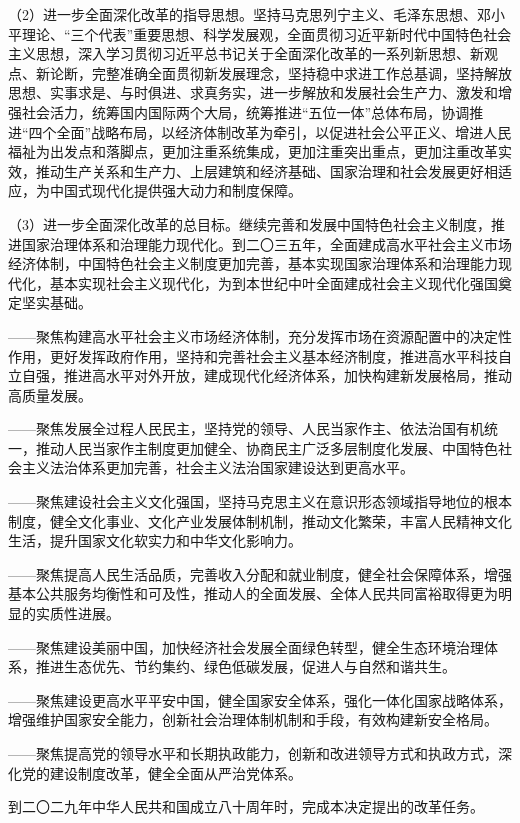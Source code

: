     （2）进一步全面深化改革的指导思想。坚持马克思列宁主义、毛泽东思想、邓小平理论、“三个代表”重要思想、科学发展观，全面贯彻习近平新时代中国特色社会主义思想，深入学习贯彻习近平总书记关于全面深化改革的一系列新思想、新观点、新论断，完整准确全面贯彻新发展理念，坚持稳中求进工作总基调，坚持解放思想、实事求是、与时俱进、求真务实，进一步解放和发展社会生产力、激发和增强社会活力，统筹国内国际两个大局，统筹推进“五位一体”总体布局，协调推进“四个全面”战略布局，以经济体制改革为牵引，以促进社会公平正义、增进人民福祉为出发点和落脚点，更加注重系统集成，更加注重突出重点，更加注重改革实效，推动生产关系和生产力、上层建筑和经济基础、国家治理和社会发展更好相适应，为中国式现代化提供强大动力和制度保障。

    （3）进一步全面深化改革的总目标。继续完善和发展中国特色社会主义制度，推进国家治理体系和治理能力现代化。到二〇三五年，全面建成高水平社会主义市场经济体制，中国特色社会主义制度更加完善，基本实现国家治理体系和治理能力现代化，基本实现社会主义现代化，为到本世纪中叶全面建成社会主义现代化强国奠定坚实基础。

    ——聚焦构建高水平社会主义市场经济体制，充分发挥市场在资源配置中的决定性作用，更好发挥政府作用，坚持和完善社会主义基本经济制度，推进高水平科技自立自强，推进高水平对外开放，建成现代化经济体系，加快构建新发展格局，推动高质量发展。

    ——聚焦发展全过程人民民主，坚持党的领导、人民当家作主、依法治国有机统一，推动人民当家作主制度更加健全、协商民主广泛多层制度化发展、中国特色社会主义法治体系更加完善，社会主义法治国家建设达到更高水平。

    ——聚焦建设社会主义文化强国，坚持马克思主义在意识形态领域指导地位的根本制度，健全文化事业、文化产业发展体制机制，推动文化繁荣，丰富人民精神文化生活，提升国家文化软实力和中华文化影响力。

    ——聚焦提高人民生活品质，完善收入分配和就业制度，健全社会保障体系，增强基本公共服务均衡性和可及性，推动人的全面发展、全体人民共同富裕取得更为明显的实质性进展。

    ——聚焦建设美丽中国，加快经济社会发展全面绿色转型，健全生态环境治理体系，推进生态优先、节约集约、绿色低碳发展，促进人与自然和谐共生。

    ——聚焦建设更高水平平安中国，健全国家安全体系，强化一体化国家战略体系，增强维护国家安全能力，创新社会治理体制机制和手段，有效构建新安全格局。

    ——聚焦提高党的领导水平和长期执政能力，创新和改进领导方式和执政方式，深化党的建设制度改革，健全全面从严治党体系。

    到二〇二九年中华人民共和国成立八十周年时，完成本决定提出的改革任务。

